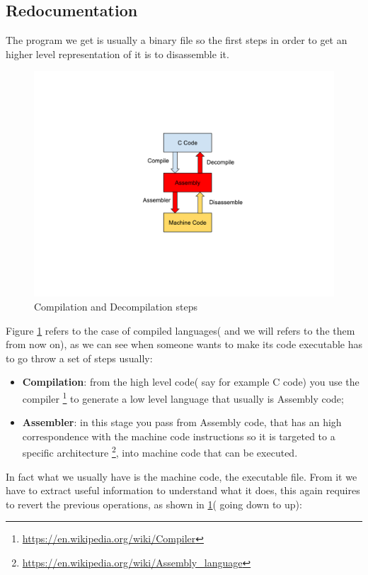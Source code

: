 \documentclass{article}
\begin{document}
\subsection{Redocumentation}
\label{section:redocumentation}
The program we get is usually a binary file so the first steps in order to get an higher level representation of it is to disassemble it.
\begin{figure}[htp]
    \centering
    \includegraphics[width=1\textwidth]{images/redocumentation.pdf}
    \caption{Compilation and Decompilation steps \citep{SlideReverse}}
    \label{fig:redocumentation}
\end{figure}
Figure \ref{fig:redocumentation} refers to the case of compiled languages( and we will refers to the them from now on), as we can see when someone wants to make its code executable has to go throw a set of steps usually:
\begin{itemize}
    \item \textbf{Compilation}: from the high level code( say for example C code) you use the compiler \footnote{\url{https://en.wikipedia.org/wiki/Compiler}} to generate a low level language that usually is Assembly code;
    \item \textbf{Assembler}: in this stage you pass from Assembly code, that has an high correspondence with the machine code instructions so it is targeted to a specific architecture \footnote{\url{https://en.wikipedia.org/wiki/Assembly_language}}, into machine code that can be executed.
\end{itemize}
In fact what we usually have is the machine code, the executable file. From it we have to extract useful information to understand what it does, this again requires to revert the previous operations, as shown in \ref{fig:redocumentation}( going down to up):
\end{document}
